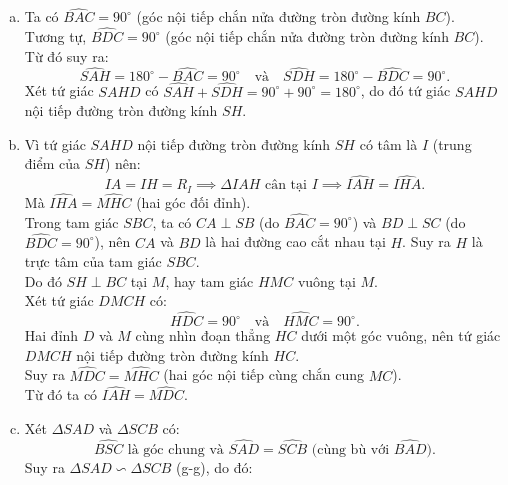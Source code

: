 \begin{bt}
{\begin{center}
	\end{center}
	\begin{enumerate}[a)]
		\item Ta có $\widehat{BAC} = 90^\circ$ (góc nội tiếp chắn nửa đường tròn đường kính $BC$).\\
		Tương tự, $\widehat{BDC} = 90^\circ$ (góc nội tiếp chắn nửa đường tròn đường kính $BC$).\\
		Từ đó suy ra:
		$$\widehat{SAH} = 180^\circ - \widehat{BAC} = 90^\circ \quad \text{và} \quad \widehat{SDH} = 180^\circ - \widehat{BDC} = 90^\circ.$$
		Xét tứ giác $SAHD$ có $\widehat{SAH} + \widehat{SDH} = 90^\circ + 90^\circ = 180^\circ$, do đó tứ giác $SAHD$ nội tiếp đường tròn đường kính $SH$.
		\item Vì tứ giác $SAHD$ nội tiếp đường tròn đường kính $SH$ có tâm là $I$ (trung điểm của $SH$) nên:
		$$IA = IH = R_I \implies \Delta IAH \text{ cân tại } I \implies \widehat{IAH} = \widehat{IHA}.$$
		Mà $\widehat{IHA} = \widehat{MHC}$ (hai góc đối đỉnh).\\
		Trong tam giác $SBC$, ta có $CA \perp SB$ (do $\widehat{BAC} = 90^\circ$) và $BD \perp SC$ (do $\widehat{BDC} = 90^\circ$), nên $CA$ và $BD$ là hai đường cao cắt nhau tại $H$. Suy ra $H$ là trực tâm của tam giác $SBC$.\\
		Do đó $SH \perp BC$ tại $M$, hay tam giác $HMC$ vuông tại $M$.\\
		Xét tứ giác $DMCH$ có:
		$$\widehat{HDC} = 90^\circ \quad \text{và} \quad \widehat{HMC} = 90^\circ.$$
		Hai đỉnh $D$ và $M$ cùng nhìn đoạn thẳng $HC$ dưới một góc vuông, nên tứ giác $DMCH$ nội tiếp đường tròn đường kính $HC$.\\
		Suy ra $\widehat{MDC} = \widehat{MHC}$ (hai góc nội tiếp cùng chắn cung $MC$).\\
		Từ đó ta có $\widehat{IAH} = \widehat{MDC}$.
		\item Xét $\Delta SAD$ và $\Delta SCB$ có:
		$$\widehat{BSC}\text{ là góc chung và } \widehat{SAD} = \widehat{SCB}\text{ (cùng bù với } \widehat{BAD}\text{)}.$$
		Suy ra $\Delta SAD \backsim \Delta SCB$ (g-g), do đó:

\end{enumerate}}
\end{bt}
